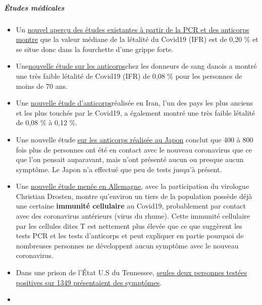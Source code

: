 \hypertarget{uxe9tudes-muxe9dicales}{%
\subparagraph{\texorpdfstring{\textbf{Études
médicales}}{Études médicales}}\label{uxe9tudes-muxe9dicales}}

\begin{itemize}
\tightlist
\item
  Un \href{https://swprs.org/studies-on-covid-19-lethality/}{nouvel
  aperçu des études existantes à partir de la PCR et des anticorps
  montre} que la valeur médiane de la létalité du Covid19 (IFR) est de
  0,20 \% et se situe donc dans la fourchette d'une grippe forte.
\item
  Une\href{https://www.medrxiv.org/content/10.1101/2020.04.24.20075291v1}{nouvelle
  étude sur les anticorps}chez les donneurs de sang danois a montré une
  très faible létalité de Covid19 (IFR) de 0,08 \% pour les personnes de
  moins de 70 ans.
\item
  Une
  \href{https://www.medrxiv.org/content/10.1101/2020.04.26.20079244v1}{nouvelle
  étude d'anticorps}réalisée en Iran, l'un des pays les plus anciens et
  les plus touchés par le Covid19, a également montré une très faible
  létalité de 0,08 \% à 0,12 \%.
\item
  Une nouvelle étude
  \href{https://www.medrxiv.org/content/10.1101/2020.04.26.20079822v1}{sur
  les anticorps réalisée au Japon} conclut que 400 à 800 fois plus de
  personnes ont été en contact avec le nouveau coronavirus que ce que
  l'on pensait auparavant, mais n'ont présenté aucun ou presque aucun
  symptôme. Le Japon n'a effectué que peu de tests jusqu'à présent.
\item
  Une
  \href{https://www.medrxiv.org/content/10.1101/2020.04.17.20061440v1}{nouvelle
  étude menée en Allemagne}, avec la participation du virologue
  Christian Drosten, montre qu'environ un tiers de la population possède
  déjà une certaine \textbf{immunité cellulaire} au Covid19,
  probablement par contact avec des coronavirus antérieurs (virus du
  rhume). Cette immunité cellulaire par les cellules dites T est
  nettement plus élevée que ce que suggèrent les tests PCR et les tests
  d'anticorps et peut expliquer en partie pourquoi de nombreuses
  personnes ne développent aucun symptôme avec le nouveau coronavirus.
\item
  Dans une prison de l'État U.S du Tennessee,
  \href{https://www.tennessean.com/story/news/politics/2020/05/01/tennessee-testing-all-inmates-prison-staff-after-multiple-outbreaks/3067388001/}{seules
  deux personnes testées positives sur 1349 présentaient des symptômes}.
\item

\end{itemize}
